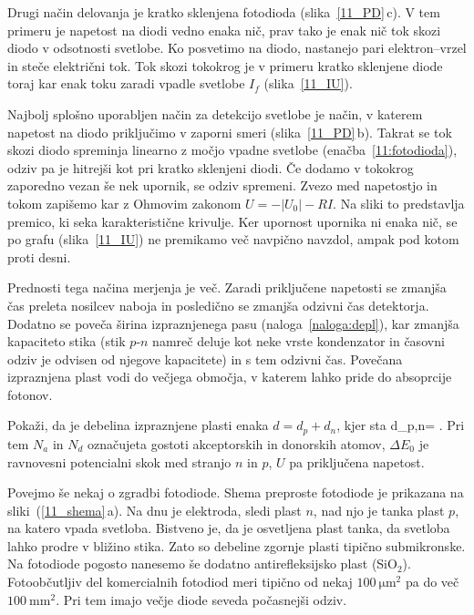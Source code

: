 Drugi način delovanja je kratko sklenjena fotodioda (slika~\ref{11_PD}\,c).
 V tem primeru je napetost na diodi 
vedno enaka nič, prav tako je enak nič tok skozi diodo v odsotnosti svetlobe. 
Ko posvetimo na diodo, nastanejo pari elektron--vrzel in steče električni tok.
Tok skozi tokokrog je v primeru kratko sklenjene diode toraj kar enak toku 
zaradi vpadle svetlobe $I_f$ (slika~\ref{11_IU}).

Najbolj splošno uporabljen način za detekcijo svetlobe je način, v katerem napetost na diodo 
priključimo v zaporni smeri (slika~\ref{11_PD}\,b).
Takrat se tok skozi diodo spreminja linearno z močjo vpadne svetlobe
(enačba~\ref{11:fotodioda}), odziv pa je hitrejši
kot pri kratko sklenjeni diodi. Če dodamo v tokokrog zaporedno vezan še nek upornik, se odziv
spremeni. Zvezo med napetostjo in tokom zapišemo kar z Ohmovim zakonom $U = -|U_0|-RI$. 
Na sliki to predstavlja premico, ki seka karakteristične krivulje. Ker upornost
upornika ni enaka nič, se po grafu (slika~\ref{11_IU}) ne premikamo več navpično navzdol, 
ampak pod kotom proti desni. 

Prednosti tega načina merjenja je več. Zaradi priključene napetosti se zmanjša čas preleta
nosilcev naboja in posledično se zmanjša odzivni čas detektorja.
Dodatno se poveča
širina izpraznjenega pasu (naloga~\ref{naloga:depl}), kar zmanjša kapaciteto stika (stik $p$-$n$ namreč deluje kot neke vrste 
kondenzator in časovni odziv je odvisen od njegove kapacitete) in s tem odzivni čas. Povečana
izpraznjena plast vodi do večjega območja, v katerem lahko pride do absoprcije fotonov. 

\begin{definition}
\label{naloga:depl}
Pokaži, da je debelina izpraznjene plasti enaka $d = d_p+d_n$, kjer sta
\beq
d_{p,n}= .
\eeq
Pri tem $N_a$ in $N_d$ označujeta gostoti akceptorskih in donorskih atomov, $\Delta E_0$ je ravnovesni potencialni
skok med stranjo $n$ in $p$, $U$ pa priključena napetost.
\end{definition}

Povejmo še nekaj o zgradbi fotodiode. Shema preproste fotodiode je prikazana na sliki~(\ref{11_shema}\,a).
Na dnu je elektroda, sledi plast $n$, nad njo je tanka plast $p$, na katero vpada svetloba.
Bistveno je, da je osvetljena plast tanka, da svetloba lahko prodre v bližino stika. Zato so 
debeline zgornje plasti tipično submikronske. Na fotodiode pogosto nanesemo
še dodatno antirefleksijsko plast (SiO$_2$). 
Fotoobčutljiv del komercialnih fotodiod
meri tipično od nekaj $100~\si{\micro\meter}^2$ pa do več $100~\si{\milli\metre}^2$. Pri 
tem imajo večje diode seveda počasnejši odziv. 

